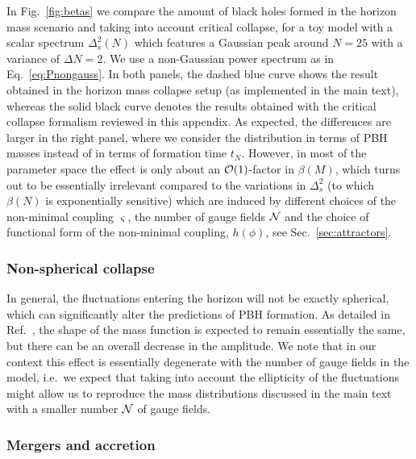 In Fig.~\ref{fig:betas} we compare the amount of black holes formed in the horizon mass scenario and taking into account critical collapse, for a toy model with a scalar spectrum $\Delta_s^2(N)$ which features a Gaussian peak around $N = 25$ with a variance of $\Delta N = 2$. We use a non-Gaussian power spectrum as in Eq.~\eqref{eq:Pnongauss}. In both panels, the dashed blue curve shows the result obtained in the horizon mass collapse setup (as implemented in the main text), whereas the solid black curve denotes the results obtained with the critical collapse formalism reviewed in this appendix. As expected, the differences are larger in the right panel, where we consider the distribution in terms of PBH masses instead of in terms of formation time $t_N$. However, in most of the parameter space the effect is only about an ${\cal O}(1)$-factor in $\beta(M)$, which turns out to be essentially irrelevant compared to the variations in $\Delta_s^2$ (to which $\beta(N)$ is exponentially sensitive) which are induced by different choices of the non-minimal coupling $\varsigma$, the number of gauge fields ${\cal N}$ and the choice of functional form of the non-minimal coupling, $h(\phi)$, see Sec.~\ref{sec:attractors}.


\subsubsection*{Non-spherical collapse}

In general, the fluctuations entering the horizon will not be exactly spherical, which can significantly alter the predictions of PBH formation. As detailed in Ref.~\cite{Kuhnel:2016exn}, the shape of the mass function is expected to remain essentially the same, but there can be an overall decrease in the amplitude. We note that in our context this effect is essentially degenerate with the number of gauge fields in the model, i.e.\ we expect that taking into account the ellipticity of the fluctuations might allow us to reproduce the mass distributions discussed in the main text with a smaller number ${\cal N}$ of gauge fields.


\subsubsection*{Mergers and accretion}


